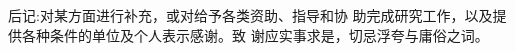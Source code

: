 
\begin{acknowledgements}
    后记:对某方面进行补充，或对给予各类资助、指导和协 助完成研究工作，以及提供各种条件的单位及个人表示感谢。致 谢应实事求是，切忌浮夸与庸俗之词。
\end{acknowledgements}
